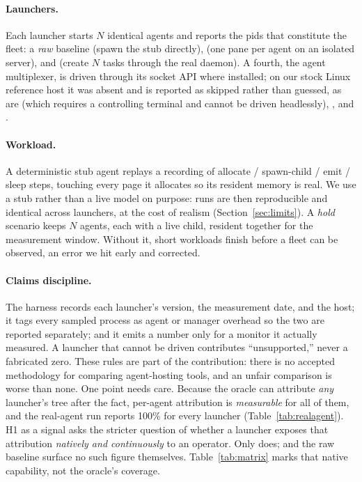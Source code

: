 \paragraph{Launchers.} Each launcher starts $N$ identical agents and reports the pids that constitute
the fleet: a \emph{raw} baseline (spawn the stub directly),  (one pane per agent on an
isolated server), and \sys{} (create $N$ tasks through the real daemon). A fourth, the 
agent multiplexer, is driven through its socket API where installed; on our stock Linux reference host
it was absent and is reported as skipped rather than guessed, as are  (which requires a
controlling terminal and cannot be driven headlessly), , and .

\paragraph{Workload.} A deterministic stub agent replays a recording of allocate / spawn-child / emit
/ sleep steps, touching every page it allocates so its resident memory is real. We use a stub rather
than a live model on purpose: runs are then reproducible and identical across launchers, at the cost
of realism (Section~\ref{sec:limits}). A \emph{hold} scenario keeps $N$ agents, each with a live
child, resident together for the measurement window. Without it, short workloads finish before a
fleet can be observed, an error we hit early and corrected.

\paragraph{Claims discipline.} The harness records each launcher's version, the measurement date, and
the host; it tags every sampled process as agent or manager overhead so the two are reported
separately; and it emits a number only for a monitor it actually measured. A launcher that cannot be
driven contributes ``unsupported,'' never a fabricated zero. These rules are part of the
contribution: there is no accepted methodology for comparing agent-hosting tools, and an unfair
comparison is worse than none. One point needs care. Because the oracle can attribute \emph{any}
launcher's tree after the fact, per-agent attribution is \emph{measurable} for all of them, and the
real-agent run reports 100\% for every launcher (Table~\ref{tab:realagent}). H1 as a signal asks the
stricter question of whether a launcher exposes that attribution \emph{natively and continuously} to
an operator. Only \sys{} does;  and the raw baseline surface no such figure themselves.
Table~\ref{tab:matrix} marks that native capability, not the oracle's coverage.

